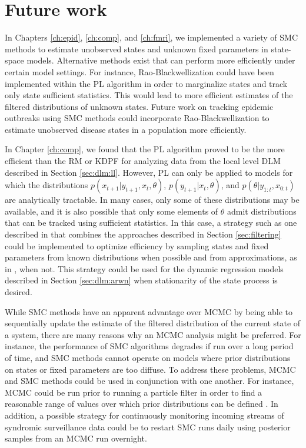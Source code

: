 \chapter{Future work \label{ch:future}}

In Chapters \ref{ch:epid}, \ref{ch:comp}, and \ref{ch:fmri}, we implemented a variety of SMC methods to estimate unobserved states and unknown fixed parameters in state-space models. Alternative methods exist that can perform more efficiently under certain model settings. For instance, Rao-Blackwellization \citep{Douc:Gods:Andr:on:2000} could have been implemented within the PL algorithm in order to marginalize states and track only state sufficient statistics. This would lead to more efficient estimates of the filtered distributions of unknown states. Future work on tracking epidemic outbreaks using SMC methods could incorporate Rao-Blackwellization to estimate unobserved disease states in a population more efficiently.

In Chapter \ref{ch:comp}, we found that the PL algorithm proved to be the more efficient than the RM or KDPF for analyzing data from the local level DLM described in Section \ref{sec:dlm:ll}. However, PL can only be applied to models for which the distributions $p(x_{t+1}|y_{t+1},x_t,\theta)$, $p(y_{t+1}|x_t,\theta)$, and $p(\theta|y_{1:t},x_{0:t})$ are analytically tractable. In many cases, only some of these distributions may be available, and it is also possible that only some elements of $\theta$ admit distributions that can be tracked using sufficient statistics. In this case, a strategy such as one described in \citet{dukic2012tracking} that combines the approaches described in Section \ref{sec:filtering} could be implemented to optimize efficiency by sampling states and fixed parameters from known distributions when possible and from approximations, as in \citet{Liu:West:comb:2001}, when not. This strategy could be used for the dynamic regression models described in Section \ref{sec:dlm:arwn} when stationarity of the state process is desired.

While SMC methods have an apparent advantage over MCMC by being able to sequentially update the estimate of the filtered distribution of the current state of a system, there are many reasons why an MCMC analysis might be preferred. For instance, the performance of SMC algorithms degrades if run over a long period of time, and SMC methods cannot operate on models where prior distributions on states or fixed parameters are too diffuse. To address these problems, MCMC and SMC methods could be used in conjunction with one another. For instance, MCMC could be run prior to running a particle filter in order to find a reasonable range of values over which prior distributions can be defined \cite[Chapter 5][]{petris:camp:2009:dynamic}. In addition, a possible strategy for continuously monitoring incoming streams of syndromic surveillance data could be to restart SMC runs daily using posterior samples from an MCMC run overnight.

